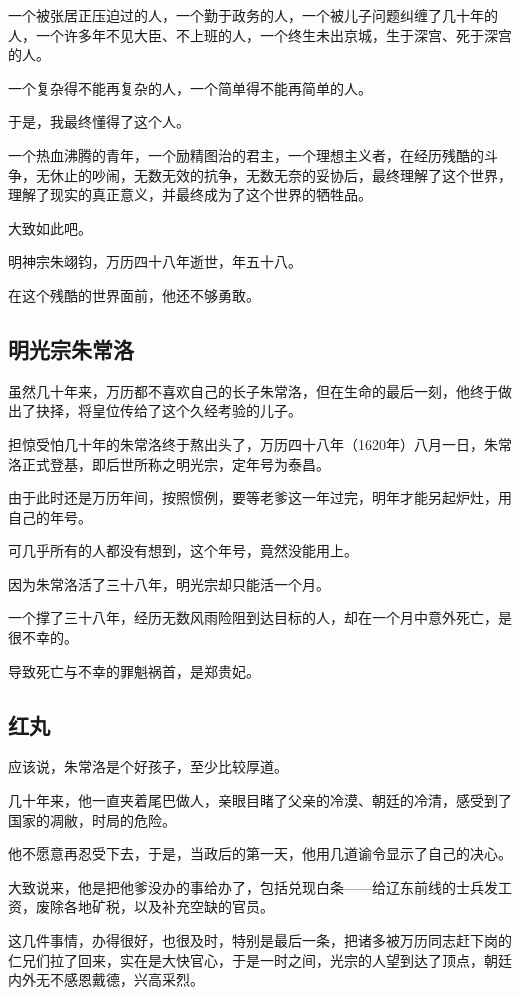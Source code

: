 \begin{multicols}{\theparacolNo}
		一个被张居正压迫过的人，一个勤于政务的人，一个被儿子问题纠缠了几十年的人，一个许多年不见大臣、不上班的人，一个终生未出京城，生于深宫、死于深宫的人。

		一个复杂得不能再复杂的人，一个简单得不能再简单的人。

		于是，我最终懂得了这个人。

		一个热血沸腾的青年，一个励精图治的君主，一个理想主义者，在经历残酷的斗争，无休止的吵闹，无数无效的抗争，无数无奈的妥协后，最终理解了这个世界，理解了现实的真正意义，并最终成为了这个世界的牺牲品。

		大致如此吧。

		明神宗朱翊钧，万历四十八年逝世，年五十八。

		在这个残酷的世界面前，他还不够勇敢。

		\subsection{明光宗朱常洛}
		虽然几十年来，万历都不喜欢自己的长子朱常洛，但在生命的最后一刻，他终于做出了抉择，将皇位传给了这个久经考验的儿子。

		担惊受怕几十年的朱常洛终于熬出头了，万历四十八年（1620年）八月一日，朱常洛正式登基，即后世所称之明光宗，定年号为泰昌。

		由于此时还是万历年间，按照惯例，要等老爹这一年过完，明年才能另起炉灶，用自己的年号。

		可几乎所有的人都没有想到，这个年号，竟然没能用上。

		因为朱常洛活了三十八年，明光宗却只能活一个月。

		一个撑了三十八年，经历无数风雨险阻到达目标的人，却在一个月中意外死亡，是很不幸的。

		导致死亡与不幸的罪魁祸首，是郑贵妃。

		\subsection{红丸}
		应该说，朱常洛是个好孩子，至少比较厚道。

		几十年来，他一直夹着尾巴做人，亲眼目睹了父亲的冷漠、朝廷的冷清，感受到了国家的凋敝，时局的危险。

		他不愿意再忍受下去，于是，当政后的第一天，他用几道谕令显示了自己的决心。

		大致说来，他是把他爹没办的事给办了，包括兑现白条——给辽东前线的士兵发工资，废除各地矿税，以及补充空缺的官员。

		这几件事情，办得很好，也很及时，特别是最后一条，把诸多被万历同志赶下岗的仁兄们拉了回来，实在是大快官心，于是一时之间，光宗的人望到达了顶点，朝廷内外无不感恩戴德，兴高采烈。


\end{multicols}
